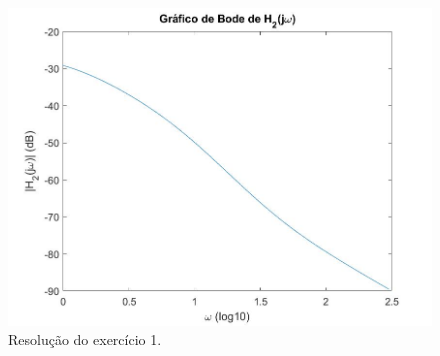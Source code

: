 \documentclass[a4paper,12pt,oneside,openany,table,xcdraw]{article}
\begin{document}
\begin{figure}[H]
\centering
\captionsetup{font=scriptsize}
\includegraphics[width=14.5cm]{Ex1_b2}
\caption{Resolução do exercício 1.}
\label{bode:h2}
\end{figure}
\end{document}
